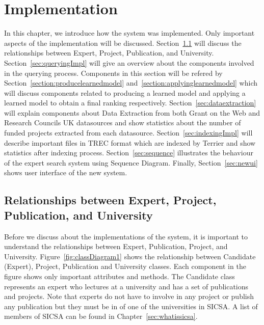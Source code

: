 
\chapter{Implementation}\label{section:implementation}
In this chapter, we introduce how the system was implemented. Only important aspects of the implementation will be discussed. 
Section~\ref{sec:relationship} will discuss the relationships between Expert, Project, Publication, and University. Section~\ref{sec:queryingImpl}
will give an overview about the components involved in the querying process. Components in this section will be refered by Section~\ref{section:producelearnedmodel}
and~\ref{section:applyinglearnedmodel} which will discuss components related to producing a learned model and applying a learned model to obtain a 
final ranking respectively. Section~\ref{sec:dataextraction} will explain components about Data Extraction from both Grant on the Web and 
Research Councils UK datasources and show statistics about the number of funded projects extracted from each datasource.
Section~\ref{sec:indexingImpl} will describe important files in TREC format which are indexed by Terrier and show statistics after indexing process.
Section~\ref{sec:sequence} illustrates the behaviour of the expert search system using Sequence Diagram. Finally, Section~\ref{sec:newui} shows 
user interface of the new system.

\section{Relationships between Expert, Project, Publication, and University}\label{sec:relationship}
Before we discuss about the implementations of the system, it is important to understand the relationships between Expert, Publication, Project, and University.
Figure~\ref{fig:classDiagram1} shows the relationship between Candidate (Expert), Project, Publication and University classes. Each component in the figure
shows only important attributes and methods. The Candidate class represents an expert who lectures at a university and has a set of publications and projects.
Note that experts do not have to involve in any project or publish any publication but they must be in of one of the universities in SICSA.
A list of members of SICSA can be found in Chapter~\ref{sec:whatissicsa}.

